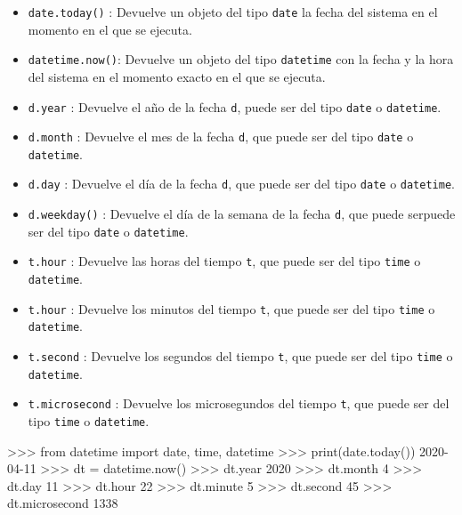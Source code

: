 \documentclass[
  spanish,
  a4paper,
]{scrreport}
\newenvironment{Shaded}{\begin{snugshade}}{\end{snugshade}}
\newcommand{\BuiltInTok}[1]{\textcolor[rgb]{0.00,0.23,0.31}{#1}}
\newcommand{\DecValTok}[1]{\textcolor[rgb]{0.68,0.00,0.00}{#1}}
\newcommand{\ErrorTok}[1]{\textcolor[rgb]{0.68,0.00,0.00}{#1}}
\newcommand{\ImportTok}[1]{\textcolor[rgb]{0.00,0.46,0.62}{#1}}
\newcommand{\NormalTok}[1]{\textcolor[rgb]{0.00,0.23,0.31}{#1}}
\newcommand{\OperatorTok}[1]{\textcolor[rgb]{0.37,0.37,0.37}{#1}}
\providecommand{\tightlist}{%
  \setlength{\itemsep}{0pt}\setlength{\parskip}{0pt}}
\begin{document}
\begin{itemize}
\tightlist
\item
  \texttt{date.today()} : Devuelve un objeto del tipo \texttt{date} la
  fecha del sistema en el momento en el que se ejecuta.
\item
  \texttt{datetime.now()}: Devuelve un objeto del tipo \texttt{datetime}
  con la fecha y la hora del sistema en el momento exacto en el que se
  ejecuta.
\item
  \texttt{d.year} : Devuelve el año de la fecha \texttt{d}, puede ser
  del tipo \texttt{date} o \texttt{datetime}.
\item
  \texttt{d.month} : Devuelve el mes de la fecha \texttt{d}, que puede
  ser del tipo \texttt{date} o \texttt{datetime}.
\item
  \texttt{d.day} : Devuelve el día de la fecha \texttt{d}, que puede ser
  del tipo \texttt{date} o \texttt{datetime}.
\item
  \texttt{d.weekday()} : Devuelve el día de la semana de la fecha
  \texttt{d}, que puede serpuede ser del tipo \texttt{date} o
  \texttt{datetime}.
\item
  \texttt{t.hour} : Devuelve las horas del tiempo \texttt{t}, que puede
  ser del tipo \texttt{time} o \texttt{datetime}.
\item
  \texttt{t.hour} : Devuelve los minutos del tiempo \texttt{t}, que
  puede ser del tipo \texttt{time} o \texttt{datetime}.
\item
  \texttt{t.second} : Devuelve los segundos del tiempo \texttt{t}, que
  puede ser del tipo \texttt{time} o \texttt{datetime}.
\item
  \texttt{t.microsecond} : Devuelve los microsegundos del tiempo
  \texttt{t}, que puede ser del tipo \texttt{time} o \texttt{datetime}.
\end{itemize}

\begin{Shaded}
\begin{Highlighting}[]
\OperatorTok{\textgreater{}\textgreater{}\textgreater{}} \ImportTok{from}\NormalTok{ datetime }\ImportTok{import}\NormalTok{ date, time, datetime}
\OperatorTok{\textgreater{}\textgreater{}\textgreater{}} \BuiltInTok{print}\NormalTok{(date.today())}
\DecValTok{2020}\OperatorTok{{-}}\DecValTok{0}\ErrorTok{4}\OperatorTok{{-}}\DecValTok{11}
\OperatorTok{\textgreater{}\textgreater{}\textgreater{}}\NormalTok{ dt }\OperatorTok{=}\NormalTok{ datetime.now()}
\OperatorTok{\textgreater{}\textgreater{}\textgreater{}}\NormalTok{ dt.year}
\DecValTok{2020}
\OperatorTok{\textgreater{}\textgreater{}\textgreater{}}\NormalTok{ dt.month}
\DecValTok{4}
\OperatorTok{\textgreater{}\textgreater{}\textgreater{}}\NormalTok{ dt.day}
\DecValTok{11}
\OperatorTok{\textgreater{}\textgreater{}\textgreater{}}\NormalTok{ dt.hour}
\DecValTok{22}
\OperatorTok{\textgreater{}\textgreater{}\textgreater{}}\NormalTok{ dt.minute}
\DecValTok{5}
\OperatorTok{\textgreater{}\textgreater{}\textgreater{}}\NormalTok{ dt.second}
\DecValTok{45}
\OperatorTok{\textgreater{}\textgreater{}\textgreater{}}\NormalTok{ dt.microsecond}
\DecValTok{1338}
\end{Highlighting}
\end{Shaded}
\end{document}
